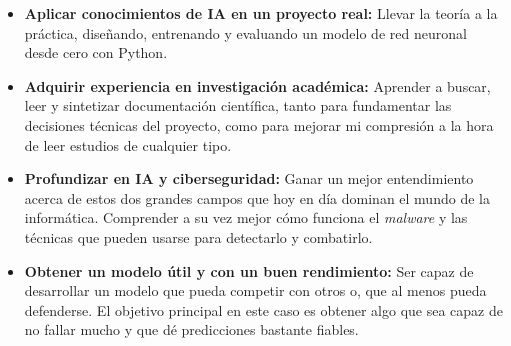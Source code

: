 \begin{itemize}
	\item \textbf{Aplicar conocimientos de IA en un proyecto real:} Llevar la teoría a la práctica, diseñando, entrenando y evaluando un modelo de red neuronal desde cero con Python.
	
	\item \textbf{Adquirir experiencia en investigación académica:} Aprender a buscar, leer y sintetizar documentación científica, tanto para fundamentar las decisiones técnicas del proyecto, como para mejorar mi compresión a la hora de leer estudios de cualquier tipo.
	
	\item \textbf{Profundizar en IA y ciberseguridad:} Ganar un mejor entendimiento acerca de estos dos grandes campos que hoy en día dominan el mundo de la informática. Comprender a su vez mejor cómo funciona el \textit{malware} y las técnicas que pueden usarse para detectarlo y combatirlo.
	
	\item \textbf{Obtener un modelo útil y con un buen rendimiento:} Ser capaz de desarrollar un modelo que pueda competir con otros o, que al menos pueda defenderse. El objetivo principal en este caso es obtener algo que sea capaz de no fallar mucho y que dé predicciones bastante fiables.
\end{itemize}

